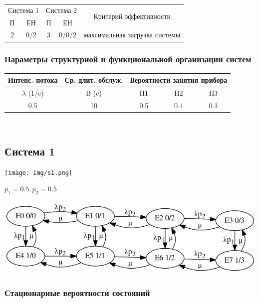 \begin{tabular}{|c|c|c|c|c|}
\hline
\multicolumn{2}{|c|}{Система 1} & \multicolumn{2}{c|}{Система 2} & \multirow{2}{*}{Критерий эффективности} \\ \cline{1-4}
П             & ЕН              & П            & ЕН              &                                         \\ \hline
2             & 0/2             & 3            & 0/0/2           & максимальная загрузка системы           \\ \hline
\end{tabular}

\subsubsection{Параметры структурной и функциональной организации систем}

\begin{tabular}{|c|c|c|c|c|}
\hline
Интенс. потока  & Ср. длит. обслуж. & \multicolumn{3}{c|}{Вероятности занятия прибора} \\ \hline
$\lambda$ (1/c) & B (c)             & П1             & П2             & П3             \\ \hline
0.5             & 10                & 0.5            & 0.4            & 0.1            \\ \hline
\end{tabular}
\\

\newpage
\subsection{Система 1}
\texttt{[image: img/s1.png]}

$p_1 = 0.5, p_2 = 0.5$

\includegraphics[resolution=128]{img/g1.png}

\subsubsection{Стационарные вероятности состояний}

